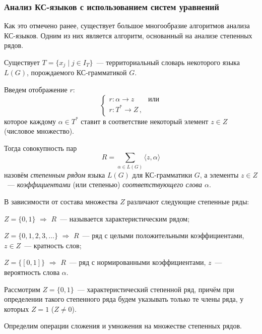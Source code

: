 
\subsubsection{Анализ КС-языков с использованием систем уравнений}

Как это отмечено ранее, существует большое многообразие алгоритмов
анализа КС-языков. Одним из них является алгоритм, основанный на
анализе степенных рядов.

\begin{defin}
  Существует $T = \{x_j \mid j \in I_T\}$~--- территориальный словарь
  некоторого языка $L(G)$, порождаемого КС-грамматикой $G$.

  Введем отображение $r$:
  $$\begin{cases}
    r \colon \alpha \to z & \text{или}\\
    r \colon T^* \to Z\,,
  \end{cases}$$
  которое каждому $\alpha \in T^*$ ставит в соответствие некоторый
  элемент $z \in Z$ (числовое множество).
\end{defin}

Тогда совокупность пар
$$
R = \sum_{\alpha \in L(G)} \langle z,\alpha \rangle
$$
назовём \emph{степенным рядом} языка $L(G)$ для КС-грамматики $G$, а
элементы $z \in Z$~--- \emph{коэффициентами} (или степенью)
\emph{соответствующего слова $\alpha$}.

В зависимости от состава множества $Z$ различают следующие степенные
ряды:
\begin{list}{)}{}
\item $Z = \{0,1\}$ $\Rightarrow$ $R$~--- называется
  характеристическим рядом;
\item $Z = \{0,1,2,3,\ldots\}$ $\Rightarrow$ $R$~--- ряд с целыми
  положительными коэффициентами, $z \in Z$~--- кратность слов;
\item $Z = \{[0,1]\}$ $\Rightarrow$ $R$~--- ряд с нормированными
  коэффициентами, $z$~--- вероятность слова $\alpha$.
\end{list}

Рассмотрим $Z = \{0,1\}$~--- характеристический степенной ряд, причём
при определении такого степенного ряда будем указывать только те члены
ряда, у которых $Z = 1$ ($Z \ne 0$).

Определим операции сложения и умножения на множестве степенных рядов.

